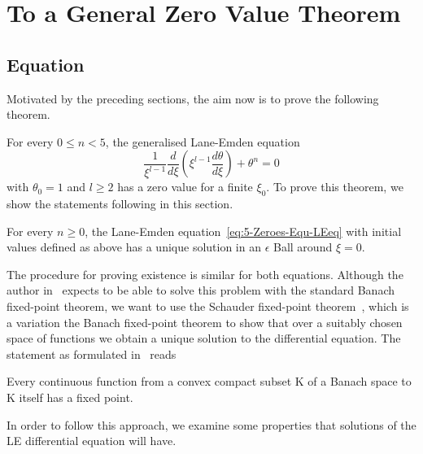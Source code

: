 \section{To a General Zero Value Theorem}
\label{sec:5-zeroes}
\subsection{\texorpdfstring{}{LE} Equation}
\label{subsec:5-zeroes-le-equation}
Motivated by the preceding sections, the aim now is to prove the following theorem.
\begin{theorem}
	\label{5-Zeroes-Theo-Lane-EmdenFiniteBoundary}
	For every $0\leq n<5$, the generalised Lane-Emden equation
	\begin{equation}
		\frac{1}{\xi^{l-1}}\frac{d}{d\xi}\left(\xi^{l-1}\frac{d\theta}{d\xi}\right)+\theta^n=0
		\label{eq:5-Zeroes-Equ-LEeq}
	\end{equation}
	with $\theta_0=1$ and $l\geq2$ has a zero value for a finite $\xi_0$.
	To prove this theorem, we show the statements following in this section.
\end{theorem}
\begin{lemma}
	\label{5-Zeroes-Lem-Lane-Emden-Local-Existence}
	For every $n\geq0$, the Lane-Emden equation~\ref{eq:5-Zeroes-Equ-LEeq} with initial values defined as above has a unique solution in an $\epsilon$ Ball around $\xi=0$.
\end{lemma}\noindent
The procedure for proving existence is similar for both equations.
Although the author in~\cite[p.~50]{quittnerSuperlinearParabolicProblems2007} expects to be able to solve this problem with the standard Banach fixed-point theorem, we want to use the Schauder fixed-point theorem~\cite{schauderFixpunktsatzFunktionalraumen1930}, which is a variation the Banach fixed-point theorem to show that over a suitably chosen space of functions we obtain a unique solution to the differential equation.
The statement as formulated in~\cite{minazzoTheoremesPointFixe2007} reads
\begin{theorem}
	Every continuous function from a convex compact subset K of a Banach space to K itself has a fixed point.
\end{theorem}\noindent
In order to follow this approach, we examine some properties that solutions of the \ac{LE} differential equation will have.
